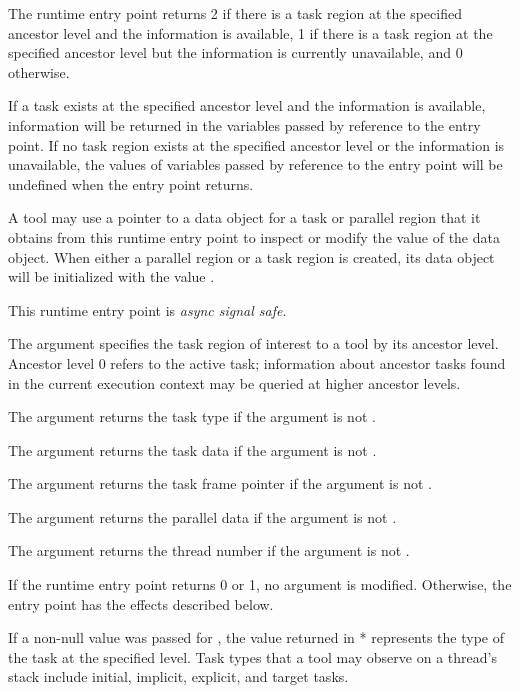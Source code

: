 The  runtime entry point
returns 2 if there is a task region at the
specified ancestor level
and the information is available, 1 if there is a task region at the
specified ancestor level but the information is currently unavailable,
and 0 otherwise.

If a task exists at the specified ancestor level and the information is available,
information will be returned in the variables passed by reference to the entry
point.  If no task region exists at the specified ancestor level
or the information is unavailable,
the values of variables passed by reference to the entry point will be
undefined when the entry point returns.

A tool may use a pointer to a data object for a task or parallel
region that it obtains from this runtime entry point to inspect or modify the
value of the data object.  When either a parallel region or a task
region is created, its data object will be initialized with the value
.

This runtime entry point is \emph{async signal safe}.

\argdesc

The argument  specifies the task region
of interest to a tool by its ancestor level.  Ancestor level 0 refers
to the active task; information about
ancestor tasks found in the current execution context may be queried at
higher ancestor levels.

The argument  returns the task type
if the argument is not .

The argument  returns the task data
if the argument is not .

The argument  returns the task frame
pointer
if the argument is not .

The argument  returns the parallel data
if the argument is not .

The argument  returns the thread number
if the argument is not .

\effect


If the runtime entry point returns 0 or 1, no argument is modified.
Otherwise, the entry point has the effects described below.

If a non-null value was passed for ,
the value returned in * represents the type of the task
at the specified level.
Task types that a tool may observe on a thread's stack include
initial, implicit, explicit, and target tasks.

